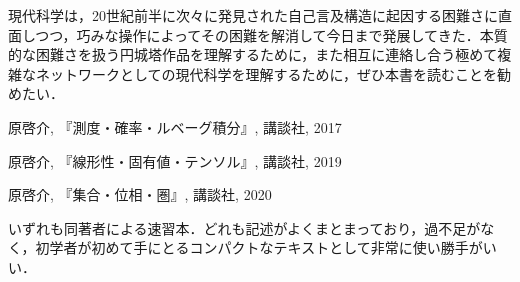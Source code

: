 \documentclass[10pt, a5paper, twoside]{jsarticle}
\theoremstyle{definition}
\begin{document}
		現代科学は，20世紀前半に次々に発見された自己言及構造に起因する困難さに直面しつつ，巧みな操作によってその困難を解消して今日まで発展してきた．本質的な困難さを扱う円城塔作品を理解するために，また相互に連絡し合う極めて複雑なネットワークとしての現代科学を理解するために，ぜひ本書を読むことを勧めたい．

		\begin{thebibliography}{9}

			 原啓介, 『測度・確率・ルベーグ積分』, 講談社, 2017

			 原啓介, 『線形性・固有値・テンソル』, 講談社, 2019

			 原啓介, 『集合・位相・圏』, 講談社, 2020

			いずれも同著者による速習本．どれも記述がよくまとまっており，過不足がなく，初学者が初めて手にとるコンパクトなテキストとして非常に使い勝手がいい．

		\end{thebibliography}
\end{document}
